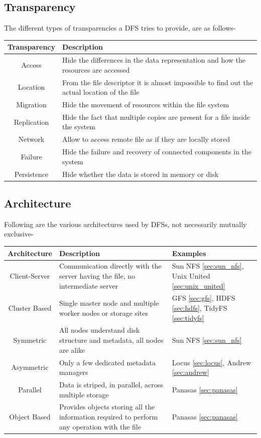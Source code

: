 \documentclass[a4paper,12pt]{article}
\begin{document}
\subsection{Transparency}
The different types of transparencies a DFS tries to provide, are as follows-
\begin{table}[h]
\begin{tabular}{|c|p{10cm}|}
\hline 
\textbf{Transparency} & \textbf{Description} \\ 
\hline 
Access & Hide the differences in the data representation and how the resources are accessed \\ 
\hline 
Location & From the file descriptor it is almost impossible to find out the actual location of the file \\ 
\hline 
Migration & Hide the movement of resources within the file system \\ 
\hline 
Replication & Hide the fact that multiple copies are present for a file inside the system \\ 
\hline 
Network & Allow to access remote file as if they are locally stored \\ 
\hline 
Failure & Hide the failure and recovery of connected components in the system \\
\hline
Persistence & Hide whether the data is stored in memory or disk \\
\hline
\end{tabular} 
\end{table}

\subsection{Architecture}
Following are the various architectures used by DFSs, not necessarily mutually exclusive-
\begin{table}[h]
\begin{tabular}{|c|p{7cm}|p{3cm}|}
\hline
\textbf{Architecture} & \textbf{Description} & \textbf{Examples} \\
\hline 
Client-Server & Communication directly with the server having the file, no intermediate server & Sun NFS \ref{sec:sun_nfs}, Unix United \ref{sec:unix_united} \\ 
\hline 
Cluster Based & Single master node and multiple worker nodes or storage sites & GFS \ref{sec:gfs}, HDFS \ref{sec:hdfs}, TidyFS \ref{sec:tidyfs} \\ 
\hline 
Symmetric & All nodes understand disk structure and metadata, all nodes are alike & Sun NFS \ref{sec:sun_nfs} \\ 
\hline 
Asymmetric & Only a few dedicated metadata managers & Locus \ref{sec:locus}, Andrew \ref{sec:andrew}  \\ 
\hline 
Parallel & Data is striped, in parallel, across multiple storage & Panasas \ref{sec:panasas} \\ 
\hline
Object Based & Provides objects storing all the information required to perform any operation with the file & Panasas \ref{sec:panasas} \\
\hline 
\end{tabular} 
\end{table}
\end{document}
